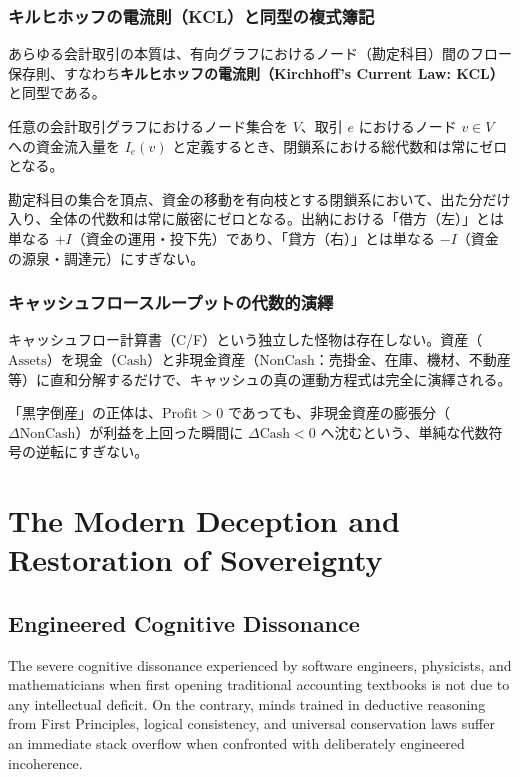 \subsection{キルヒホッフの電流則（KCL）と同型の複式簿記}
あらゆる会計取引の本質は、有向グラフにおけるノード（勘定科目）間のフロー保存則、すなわち\textbf{キルヒホッフの電流則（Kirchhoff's Current Law: KCL）}と同型である。

任意の会計取引グラフにおけるノード集合を $V$、取引 $e$ におけるノード $v \in V$ への資金流入量を $I_e(v)$ と定義するとき、閉鎖系における総代数和は常にゼロとなる。



勘定科目の集合を頂点、資金の移動を有向枝とする閉鎖系において、出た分だけ入り、全体の代数和は常に厳密にゼロとなる。出納における「借方（左）」とは単なる $+I$（資金の運用・投下先）であり、「貸方（右）」とは単なる $-I$（資金の源泉・調達元）にすぎない。

\subsection{キャッシュフロースループットの代数的演繹}
キャッシュフロー計算書（C/F）という独立した怪物は存在しない。資産（$\text{Assets}$）を現金（$\text{Cash}$）と非現金資産（$\text{NonCash}$：売掛金、在庫、機材、不動産等）に直和分解するだけで、キャッシュの真の運動方程式は完全に演繹される。



「黒字倒産」の正体は、$\text{Profit} > 0$ であっても、非現金資産の膨張分（$\Delta \text{NonCash}$）が利益を上回った瞬間に $\Delta \text{Cash} < 0$ へ沈むという、単純な代数符号の逆転にすぎない。

\else
\chapter{The Modern Deception and Restoration of Sovereignty}
\label{chap:introduction}

\section{Engineered Cognitive Dissonance}
The severe cognitive dissonance experienced by software engineers, physicists, and mathematicians when first opening traditional accounting textbooks is not due to any intellectual deficit. On the contrary, minds trained in deductive reasoning from First Principles, logical consistency, and universal conservation laws suffer an immediate stack overflow when confronted with deliberately engineered incoherence.

